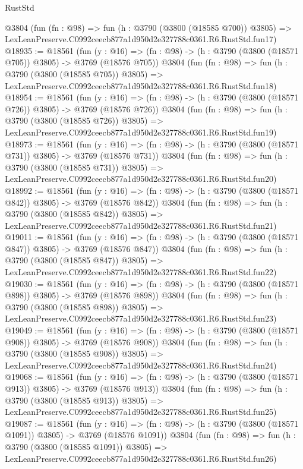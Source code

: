 \begin{lexlean}{RustStd}
\begin{coremodule}
    @3804
    (fun (fn : @98) =>
    fun (h : @3790 (@3800 (@18585 @700)) @3805) =>
    LexLeanPreserve.C0992ceecb877a1d950d2e327788c0361.R6.RustStd.fun17)
@18935 := @18561
    (fun (y : @16) => (fn : @98) -> (h : @3790 (@3800 (@18571 @705)) @3805) -> @3769 (@18576 @705))
    @3804
    (fun (fn : @98) =>
    fun (h : @3790 (@3800 (@18585 @705)) @3805) =>
    LexLeanPreserve.C0992ceecb877a1d950d2e327788c0361.R6.RustStd.fun18)
@18954 := @18561
    (fun (y : @16) => (fn : @98) -> (h : @3790 (@3800 (@18571 @726)) @3805) -> @3769 (@18576 @726))
    @3804
    (fun (fn : @98) =>
    fun (h : @3790 (@3800 (@18585 @726)) @3805) =>
    LexLeanPreserve.C0992ceecb877a1d950d2e327788c0361.R6.RustStd.fun19)
@18973 := @18561
    (fun (y : @16) => (fn : @98) -> (h : @3790 (@3800 (@18571 @731)) @3805) -> @3769 (@18576 @731))
    @3804
    (fun (fn : @98) =>
    fun (h : @3790 (@3800 (@18585 @731)) @3805) =>
    LexLeanPreserve.C0992ceecb877a1d950d2e327788c0361.R6.RustStd.fun20)
@18992 := @18561
    (fun (y : @16) => (fn : @98) -> (h : @3790 (@3800 (@18571 @842)) @3805) -> @3769 (@18576 @842))
    @3804
    (fun (fn : @98) =>
    fun (h : @3790 (@3800 (@18585 @842)) @3805) =>
    LexLeanPreserve.C0992ceecb877a1d950d2e327788c0361.R6.RustStd.fun21)
@19011 := @18561
    (fun (y : @16) => (fn : @98) -> (h : @3790 (@3800 (@18571 @847)) @3805) -> @3769 (@18576 @847))
    @3804
    (fun (fn : @98) =>
    fun (h : @3790 (@3800 (@18585 @847)) @3805) =>
    LexLeanPreserve.C0992ceecb877a1d950d2e327788c0361.R6.RustStd.fun22)
@19030 := @18561
    (fun (y : @16) => (fn : @98) -> (h : @3790 (@3800 (@18571 @898)) @3805) -> @3769 (@18576 @898))
    @3804
    (fun (fn : @98) =>
    fun (h : @3790 (@3800 (@18585 @898)) @3805) =>
    LexLeanPreserve.C0992ceecb877a1d950d2e327788c0361.R6.RustStd.fun23)
@19049 := @18561
    (fun (y : @16) => (fn : @98) -> (h : @3790 (@3800 (@18571 @908)) @3805) -> @3769 (@18576 @908))
    @3804
    (fun (fn : @98) =>
    fun (h : @3790 (@3800 (@18585 @908)) @3805) =>
    LexLeanPreserve.C0992ceecb877a1d950d2e327788c0361.R6.RustStd.fun24)
@19068 := @18561
    (fun (y : @16) => (fn : @98) -> (h : @3790 (@3800 (@18571 @913)) @3805) -> @3769 (@18576 @913))
    @3804
    (fun (fn : @98) =>
    fun (h : @3790 (@3800 (@18585 @913)) @3805) =>
    LexLeanPreserve.C0992ceecb877a1d950d2e327788c0361.R6.RustStd.fun25)
@19087 := @18561
    (fun (y : @16) =>
    (fn : @98) -> (h : @3790 (@3800 (@18571 @1091)) @3805) -> @3769 (@18576 @1091))
    @3804
    (fun (fn : @98) =>
    fun (h : @3790 (@3800 (@18585 @1091)) @3805) =>
    LexLeanPreserve.C0992ceecb877a1d950d2e327788c0361.R6.RustStd.fun26)

\end{coremodule}
\end{lexlean}
